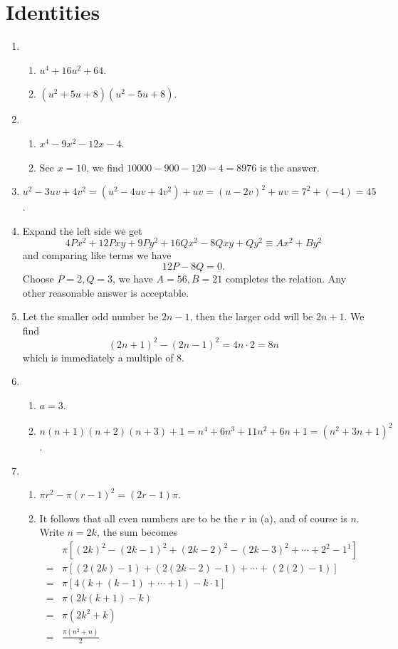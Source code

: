 \documentclass[12pt]{article}
\begin{document}
    \section{Identities}
    \begin{enumerate}
        \item \begin{enumerate}
            \item $u^4+16u^2+64$.
            \item $(u^2+5u+8)(u^2-5u+8)$.
        \end{enumerate}
        \item \begin{enumerate}
            \item $x^4-9x^2-12x-4$.
            \item See $x=10$, we find $10000-900-120-4=8976$ is the answer.
        \end{enumerate}
        \item $u^2-3uv+4v^2 = (u^2-4uv+4v^2)+uv = (u-2v)^2+uv = 7^2+(-4)=45$.
        \item Expand the left side we get \[4Px^2+12Pxy+9Py^2+16Qx^2-8Qxy+Qy^2\equiv Ax^2+By^2\] and comparing like terms we have \[12P-8Q = 0.\] Choose $P=2, Q=3$, we have $A=56, B=21$ completes the relation. Any other reasonable answer is acceptable.
        \item Let the smaller odd number be $2n-1$, then the larger odd will be $2n+1$. We find \[(2n+1)^2-(2n-1)^2=4n\cdot 2 = 8n\] which is immediately a multiple of 8.
        \item \begin{enumerate}
            \item $a=3$.
            \item $n(n+1)(n+2)(n+3)+1 = n^4+6n^3+11n^2+6n+1 = (n^2+3n+1)^2$.
        \end{enumerate}
        \item \begin{enumerate}
            \item $\pi r^2 - \pi (r-1)^2 = (2r-1)\pi$.
            \item It follows that all even numbers are to be the $r$ in (a), and of course is $n$. Write $n=2k$, the sum becomes \begin{align*}
                &\pi[(2k)^2 - (2k-1)^2 + (2k-2)^2 - (2k-3)^2 + \cdots + 2^2 - 1^1]\\
                =&\pi[(2(2k)-1) + (2(2k-2)-1) + \cdots + (2(2)-1)]\\
                =&\pi[4(k+(k-1)+\cdots+1) - k\cdot 1]\\
                =&\pi(2k(k+1)-k)\\
                =&\pi(2k^2+k)\\
                =&\frac{\pi(n^2+n)}{2}
            \end{align*}
        \end{enumerate}
    \end{enumerate}
    \newpage
\end{document}
